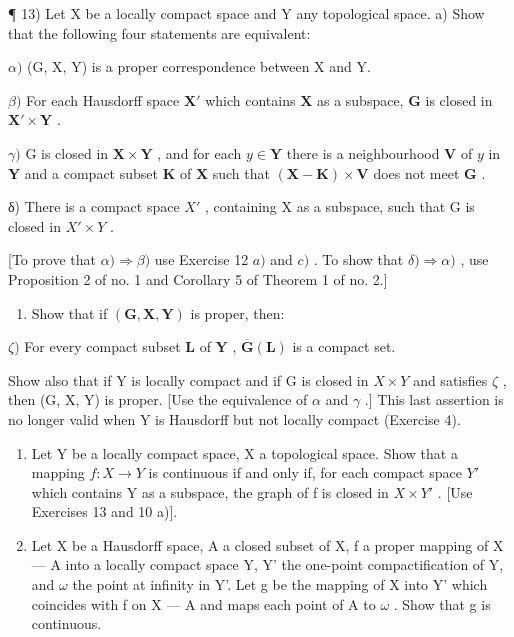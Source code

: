 ¶ 13) Let X be a locally compact space and Y any topological space. a) Show that the following four statements are equivalent:

\(\alpha)\) (G, X, Y) is a proper correspondence between X and Y.

\(\beta)\) For each Hausdorff space \(\mathbf{X}'\) which contains \(\mathbf{X}\) as a subspace, \(\mathbf{G}\) is closed in \(\mathbf{X}' \times \mathbf{Y}\) .

\(\gamma)\) G is closed in \(\mathbf{X} \times \mathbf{Y}\) , and for each \(y \in \mathbf{Y}\) there is a neighbourhood \(\mathbf{V}\) of \(y\) in \(\mathbf{Y}\) and a compact subset \(\mathbf{K}\) of \(\mathbf{X}\) such that \((\mathbf{X} - \mathbf{K}) \times \mathbf{V}\) does not meet \(\mathbf{G}\) .

δ) There is a compact space \(X'\) , containing X as a subspace, such that G is closed in \(X' \times Y\) .

{[}To prove that \(\alpha) \Longrightarrow \beta)\) use Exercise 12 \(a)\) and \(c)\) . To show that \(\delta) \Longrightarrow \alpha)\) , use Proposition 2 of no. 1 and Corollary 5 of Theorem 1 of no. 2.{]}

\begin{enumerate}
\def\labelenumi{\alph{enumi})}
\setcounter{enumi}{1}
\tightlist
\item
  Show that if \((\mathbf{G},\mathbf{X},\mathbf{Y})\) is proper, then:
\end{enumerate}

\(\zeta)\) For every compact subset \(\mathbf{L}\) of \(\mathbf{Y}\) , \(\overline{\mathbf{G}}(\mathbf{L})\) is a compact set.

Show also that if Y is locally compact and if G is closed in \(X \times Y\) and satisfies \(\zeta\) , then (G, X, Y) is proper. {[}Use the equivalence of \(\alpha\) and \(\gamma\) .{]} This last assertion is no longer valid when Y is Hausdorff but not locally compact (Exercise 4).

\begin{enumerate}
\def\labelenumi{\arabic{enumi})}
\setcounter{enumi}{13}
\item
  Let Y be a locally compact space, X a topological space. Show that a mapping \(f: X \rightarrow Y\) is continuous if and only if, for each compact space \(Y'\) which contains Y as a subspace, the graph of f is closed in \(X \times Y'\) . {[}Use Exercises 13 and 10 a){]}.
\item
  Let X be a Hausdorff space, A a closed subset of X, f a proper mapping of X --- A into a locally compact space Y, Y' the one-point compactification of Y, and \(\omega\) the point at infinity in Y'. Let g be the mapping of X into Y' which coincides with f on X --- A and maps each point of A to \(\omega\) . Show that g is continuous.
\end{enumerate}

